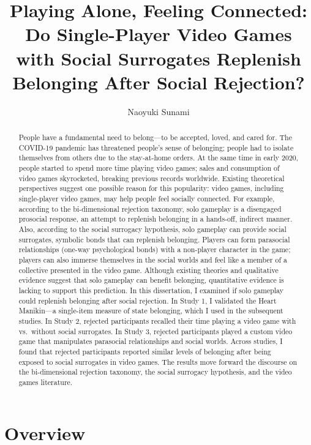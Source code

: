 \documentclass[
]{udthesis}
\title{Playing Alone, Feeling Connected: Do Single-Player Video Games with Social Surrogates Replenish Belonging After Social Rejection?}
\author{Naoyuki Sunami}
\date{}
\begin{document}
\maketitle
\begin{abstract}
People have a fundamental need to belong---to be accepted, loved, and cared for. The COVID-19 pandemic has threatened people's sense of belonging; people had to isolate themselves from others due to the stay-at-home orders. At the same time in early 2020, people started to spend more time playing video games; sales and consumption of video games skyrocketed, breaking previous records worldwide. Existing theoretical perspectives suggest one possible reason for this popularity: video games, including single-player video games, may help people feel socially connected. For example, according to the bi-dimensional rejection taxonomy, solo gameplay is a disengaged prosocial response, an attempt to replenish belonging in a hands-off, indirect manner. Also, according to the social surrogacy hypothesis, solo gameplay can provide social surrogates, symbolic bonds that can replenish belonging. Players can form parasocial relationships (one-way psychological bonds) with a non-player character in the game; players can also immerse themselves in the social worlds and feel like a member of a collective presented in the video game. Although existing theories and qualitative evidence suggest that solo gameplay can benefit belonging, quantitative evidence is lacking to support this prediction. In this dissertation, I examined if solo gameplay could replenish belonging after social rejection. In Study 1, I validated the Heart Manikin---a single-item measure of state belonging, which I used in the subsequent studies. In Study 2, rejected participants recalled their time playing a video game with vs.~without social surrogates. In Study 3, rejected participants played a custom video game that manipulates parasocial relationships and social worlds. Across studies, I found that rejected participants reported similar levels of belonging after being exposed to social surrogates in video games. The results move forward the discourse on the bi-dimensional rejection taxonomy, the social surrogacy hypothesis, and the video games literature.
\end{abstract}

\chapter{Overview}\label{overview}
\end{document}

